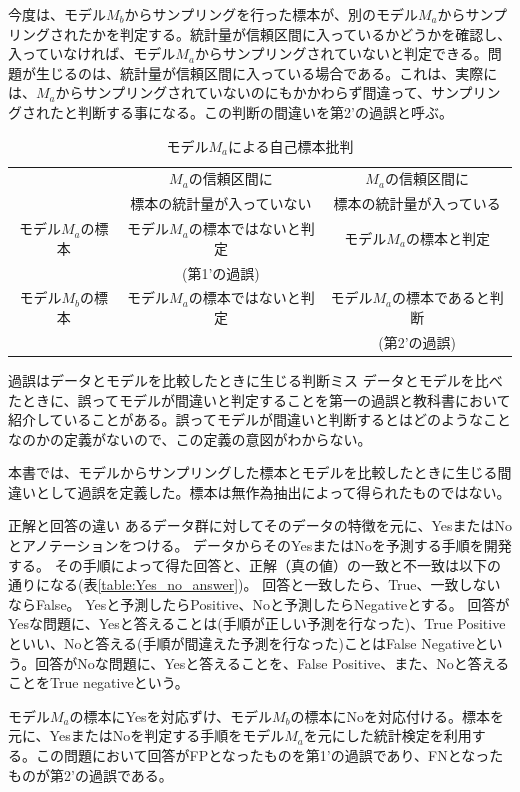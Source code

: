 今度は、モデル$M_b$からサンプリングを行った標本が、別のモデル$M_a$からサンプリングされたかを判定する。統計量が信頼区間に入っているかどうかを確認し、入っていなければ、モデル$M_a$からサンプリングされていないと判定できる。問題が生じるのは、統計量が信頼区間に入っている場合である。これは、実際には、$M_a$からサンプリングされていないのにもかかわらず間違って、サンプリングされたと判断する事になる。この判断の間違いを第2'の過誤と呼ぶ。

\begin{table}[hbtp]
    \caption{モデル$M_a$による自己標本批判}
    \label{table:type_error}
    \centering
    \begin{tabular}{ccc}
      \hline
        &  $M_a$の信頼区間に &  $M_a$の信頼区間に \\
        & 標本の統計量が入っていない & 標本の統計量が入っている \\
      \hline \hline
      モデル$M_a$の標本  & モデル$M_a$の標本ではないと判定  & モデル$M_a$の標本と判定 \\
      & (第1'の過誤) & \\
      モデル$M_b$の標本  & モデル$M_a$の標本ではないと判定   & モデル$M_a$の標本であると判断 \\
      & & (第2'の過誤) \\
      \hline
    \end{tabular}
  \end{table}

  \begin{SMbox}{過誤はデータとモデルを比較したときに生じる判断ミス}
  データとモデルを比べたときに、誤ってモデルが間違いと判定することを第一の過誤と教科書において紹介していることがある。誤ってモデルが間違いと判断するとはどのようなことなのかの定義がないので、この定義の意図がわからない。

  本書では、モデルからサンプリングした標本とモデルを比較したときに生じる間違いとして過誤を定義した。標本は無作為抽出によって得られたものではない。
  \end{SMbox}


\begin{SMbox}{正解と回答の違い}
    あるデータ群に対してそのデータの特徴を元に、YesまたはNoとアノテーションをつける。
    データからそのYesまたはNoを予測する手順を開発する。
    その手順によって得た回答と、正解（真の値）の一致と不一致は以下の通りになる(表\ref{table:Yes_no_answer})。
    回答と一致したら、True、一致しないならFalse。
    Yesと予測したらPositive、Noと予測したらNegativeとする。
    回答がYesな問題に、Yesと答えることは(手順が正しい予測を行なった)、True Positiveといい、Noと答える(手順が間違えた予測を行なった)ことはFalse Negativeという。回答がNoな問題に、Yesと答えることを、False Positive、また、Noと答えることをTrue negativeという。

    モデル$M_a$の標本にYesを対応ずけ、モデル$M_b$の標本にNoを対応付ける。標本を元に、YesまたはNoを判定する手順をモデル$M_a$を元にした統計検定を利用する。この問題において回答がFPとなったものを第1'の過誤であり、FNとなったものが第2'の過誤である。
    \end{SMbox}
    
